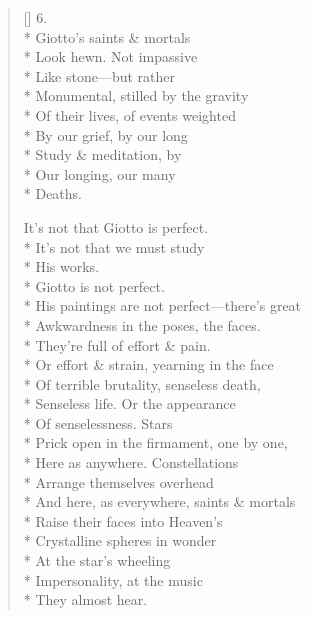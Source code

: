 \begin{verse}[\versewidth]
6.\\*
Giotto's saints \& mortals\\*
Look hewn. Not impassive\\*
Like stone---but rather\\*
Monumental, stilled by the gravity\\*
Of their lives, of events weighted\\*
By our grief, by our long\\*
Study \& meditation, by\\*
Our longing, our many\\*
Deaths.

It's not that Giotto is perfect.\\*
It's not that we must study\\*
His works.\\*
                Giotto is not perfect.\\*
His paintings are not perfect---there's great\\*
Awkwardness in the poses, the faces.\\*
They're full of effort \& pain.\\*
Or effort \& strain, yearning in the face\\*
Of terrible brutality, senseless death,\\*
Senseless life. Or the appearance\\*
Of senselessness. Stars\\*
Prick open in the firmament, one by one,\\*
Here as anywhere. Constellations\\*
Arrange themselves overhead\\*
And here, as everywhere, saints \& mortals\\*
Raise their faces into Heaven's\\*
Crystalline spheres in wonder\\*
At the star's wheeling\\*
Impersonality, at the music\\*
They almost hear.
\end{verse}
